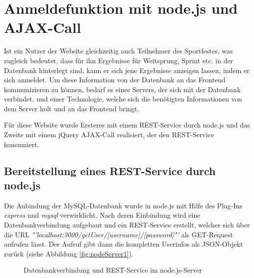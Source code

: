 \section{Anmeldefunktion mit node.js und AJAX-Call}
\label{Anmeldefunktion mit node.js und AJAX-Call}
Ist ein Nutzer der Website gleichzeitig auch Teilnehmer des Sportfestes, was zugleich bedeutet, dass für ihn Ergebnisse für Weitsprung, Sprint etc. in der Datenbank hinterlegt sind, kann er sich jene Ergebnisse anzeigen lassen, indem er sich anmeldet. Um diese Information von der Datenbank an das Frontend kommunizieren zu können, bedarf es eines Servers, der sich mit der Datenbank verbindet, und einer Technologie, welche sich die benötigten Informationen von dem Server holt und an das Frontend bringt. 
\par
Für diese Website wurde Ersteres mit einem REST-Service durch node.js und das Zweite mit einem jQuery AJAX-Call realisiert, der den REST-Service konsumiert.

\subsection{Bereitstellung eines REST-Service durch node.js}
\label{Bereitstellung eines REST-Service durch node.js}
Die Anbindung der MySQL-Datenbank wurde in node.js mit Hilfe des Plug-Ins \textit{express} und \textit{mysql} verwirklicht. Nach deren Einbindung wird eine Datenbankverbindung aufgebaut und ein REST-Service erstellt, welcher sich über die URL \textit{"'localhost:3000/getUser/[username]/[password]"'} als GET-Request aufrufen lässt. Der Aufruf gibt dann die kompletten Userinfos als JSON-Objekt zurück (siehe Abbildung \vref{fig:nodeServer1}).

\begin{figure}[!h]
	\caption{Datenbankverbindung und REST-Service im node.js-Server}
	\label{fig:nodeServer1}
\end{figure}


